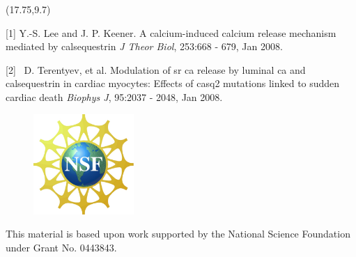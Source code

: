 \documentclass[a0]{a0poster}
\def\Head#1{\noindent{\begin{center}\LARGE\color{DarkBlue} #1\end{center}}}
\begin{document}

\begin{textblock}{5.5}(17.75,9.7)
\Head{--- References ---}
\vspace{-0.3in}
\begin{description}

\item{[1]}  Y.-S. Lee and J. P. Keener. A calcium-induced calcium release mechanism mediated by calsequestrin \textit{J Theor Biol}, 253:668 - 679, Jan 2008.

\item{[2]} \ D. Terentyev, et al. Modulation of sr ca release by luminal ca and calsequestrin in cardiac myocytes: Effects of casq2 mutations linked to sudden cardiac death \textit{Biophys J}, 95:2037 - 2048, Jan 2008. 



\end{description} 

\begin{figure}
\begin{center}

{\includegraphics[height=1.5in]{pics/NSF_correct_logo}}
\label{fig:CSQ}
\end{center}
\end{figure}
This material is based upon work supported by the National Science Foundation under Grant No. 0443843.
\end{textblock}
\end{document}
